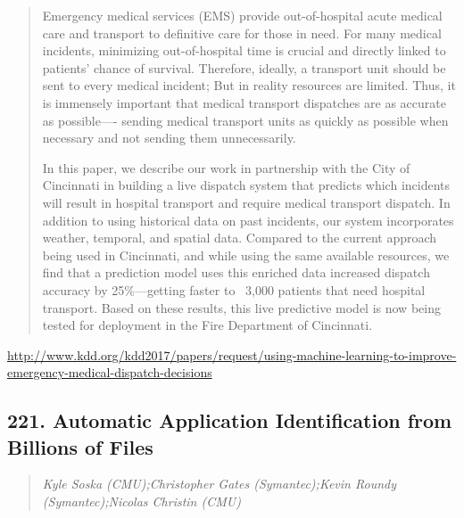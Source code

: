 \documentclass{article}
\begin{document}
\begin{quote}
Emergency medical services (EMS) provide out-of-hospital acute medical care and transport to definitive care for those in need. For many medical incidents, minimizing out-of-hospital time is crucial and directly linked to patients’ chance of survival. Therefore, ideally, a transport unit should be sent to every medical incident; But in reality resources are limited. Thus, it is immensely important that medical transport dispatches are as accurate as possible—- sending medical transport units as quickly as possible when necessary and not sending them unnecessarily.







 In this paper, we describe our work in partnership with the City of Cincinnati in building a live dispatch system that predicts which incidents will result in hospital transport and require medical transport dispatch. In addition to using historical data on past incidents, our system incorporates weather, temporal, and spatial data. Compared to the current approach being used in Cincinnati, and while using the same available resources, we find that a prediction model uses this enriched data increased dispatch accuracy by 25\%—getting faster to ~3,000 patients that need hospital transport. Based on these results, this live predictive model is now being tested for deployment in the Fire Department of Cincinnati.
\end{quote}

\href{http://www.kdd.org/kdd2017/papers/request/using-machine-learning-to-improve-emergency-medical-dispatch-decisions}{http://www.kdd.org/kdd2017/papers/request/using-machine-learning-to-improve-emergency-medical-dispatch-decisions}

\subsection{221. Automatic Application Identification from Billions of Files}

\begin{quote}
\footnotesize{\textit{Kyle Soska (CMU);Christopher Gates (Symantec);Kevin Roundy (Symantec);Nicolas Christin (CMU)}}

\end{quote}
\end{document}
